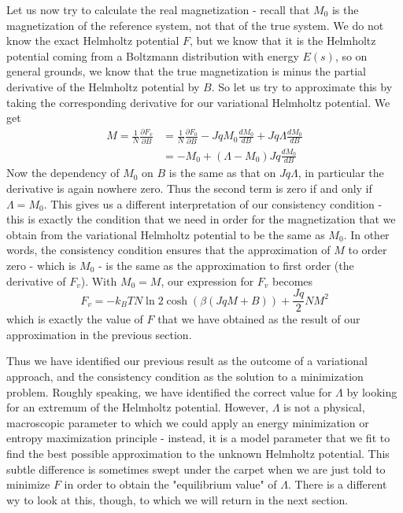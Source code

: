 \documentclass[a4paper, draft]{article}
\theoremstyle{own}
\theoremstyle{remark}
\begin{document}
Let us now try to calculate the real magnetization - recall that $M_0$ is the magnetization of the reference system, not that of the true system. We do not know the exact Helmholtz potential $F$, but we know that it is the Helmholtz potential coming from a Boltzmann distribution with energy $E(s)$, so on general grounds, we know that the true magnetization is minus the partial derivative of the Helmholtz potential by $B$. So let us try to approximate this by taking the corresponding derivative for our variational Helmholtz potential. We get
\begin{align*}
M = \frac{1}{N} \frac{\partial F_v}{\partial B} &= \frac{1}{N} \frac{\partial F_0}{\partial B}  -  J  q M_0 \frac{dM_0}{d B}  + J q \Lambda  \frac{dM_0}{d B} \\
&= -  M_0 + (\Lambda -  M_0) J q  \frac{dM_0}{d B} 
\end{align*}
Now the dependency of $M_0$ on $B$ is the same as that on $J q \Lambda$, in particular the derivative is again nowhere zero. Thus the second term is zero if and only if $\Lambda = M_0$. 
This gives us a different interpretation of our consistency condition - this is exactly the condition that we need in order for the magnetization that we obtain from the variational Helmholtz potential to be the same as $M_0$. In other words, the consistency condition ensures that the approximation of $M$ to order zero - which is $M_0$ - is the same as the approximation to first order (the derivative of $F_v$). With $M_0 = M$, our expression for $F_v$ becomes
$$
F_v = - k_B T N \ln 2 \cosh(\beta(JqM + B)) + \frac{Jq}{2}  N M^2 
$$
which is exactly the value of $F$ that we have obtained as the result of our approximation in the previous section.

Thus we have identified our previous result as the outcome of a variational approach, and the consistency condition as the solution to a minimization problem. Roughly speaking, we have identified the correct value for $\Lambda$ by looking for an extremum of the Helmholtz potential. However, $\Lambda$ is not a physical, macroscopic parameter to which we could apply an energy minimization or entropy maximization principle - instead, it is a model parameter that we fit to find the best possible approximation to the unknown Helmholtz potential. This subtle difference is sometimes swept under the carpet when we are just told to minimize $F$ in order to obtain the "equilibrium value" of $\Lambda$. There is a different wy to look at this, though, to which we will return in the next section.
\end{document}
